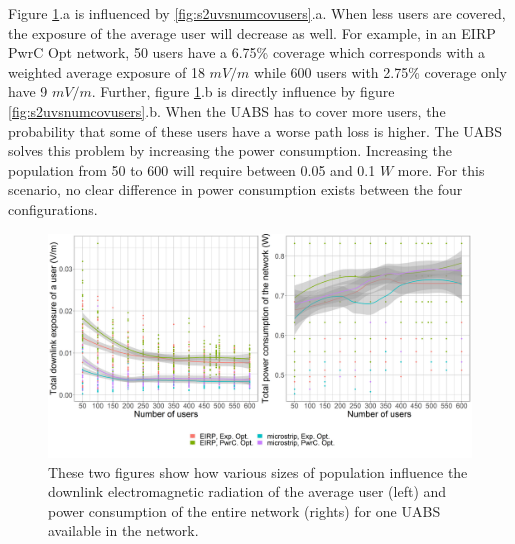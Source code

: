 \documentclass[twocolumn]{phdsymp} %
\begin{document}
Figure  \ref{fig:s2b_dlAndPc}.a  is influenced by  \ref{fig:s2uvsnumcovusers}.a. When less users are 
covered, the exposure of the average user will decrease as well.
For example, in an EIRP \gls{PwrC Opt} network, 50 users have a 6.75\% coverage which corresponds with a weighted average exposure of  18 $mV/m$
while 600 users with 2.75\% coverage only have 9 $mV/m$.
Further,  figure \ref{fig:s2b_dlAndPc}.b is directly influence by figure \ref{fig:s2uvsnumcovusers}.b. When the \gls{UABS} has to cover more users,
the probability that some of these users have a worse path loss is higher. The \gls{UABS} solves this problem by increasing the 
power consumption. Increasing the population from 50 to 600 will require between 0.05 and 0.1 $W$ more. 
For this scenario, no clear difference in power consumption exists between the four configurations.

\begin{figure}[h!]
  \includegraphics[width=\linewidth]{../results/s2/uvsdlAndPc.png}
  \caption{These two figures show how various sizes of population influence the downlink electromagnetic radiation of the average user (left) and 
  power consumption of the entire network (rights) for one \acs{UABS} available in the network.}
  \label{fig:s2b_dlAndPc}
\end{figure}
\end{document}
